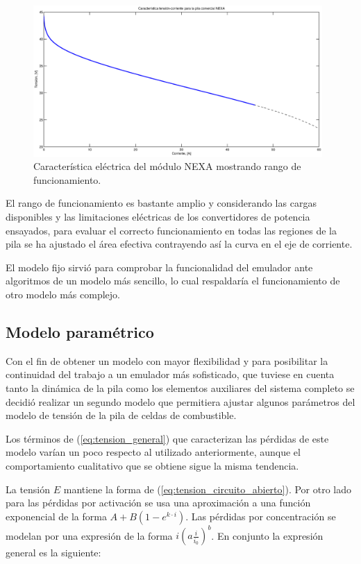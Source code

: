 \begin{figure}
 \centering
 \includegraphics[width=11cm]{gfx/caracteristica_NEXA.eps}
 \caption{Característica eléctrica del módulo NEXA mostrando rango de funcionamiento.}
 \label{fig:caracteristica_NEXA}
\end{figure}

El rango de funcionamiento es bastante amplio y considerando las cargas disponibles y las limitaciones eléctricas de los convertidores de
potencia ensayados, para evaluar el correcto funcionamiento en todas las regiones de la pila se ha ajustado el área efectiva contrayendo
así la curva en el eje de corriente.

El modelo fijo sirvió para comprobar la funcionalidad del emulador ante algoritmos de un modelo más sencillo, lo cual respaldaría el
funcionamiento de otro modelo más complejo.

\subsection{Modelo paramétrico}
Con el fin de obtener un modelo con mayor flexibilidad y para posibilitar la continuidad del trabajo a un emulador más sofisticado, que
tuviese en cuenta tanto la dinámica de la pila como los elementos auxiliares del sistema completo se decidió realizar un segundo modelo
que permitiera ajustar algunos parámetros del modelo de tensión de la pila de celdas de combustible.

Los términos de (\ref{eq:tension_general}) que caracterizan las pérdidas de este modelo varían un poco respecto al utilizado
anteriormente, aunque el comportamiento cualitativo que se obtiene sigue la misma tendencia. 

La tensión $E$ mantiene la forma de (\ref{eq:tension_circuito_abierto}). Por otro lado para las pérdidas por activación se usa una
aproximación a una función exponencial de la forma $A+B(1-e^{k\cdot i})$. Las pérdidas por concentración se modelan por una expresión
de la forma $i \left( a \frac{i}{i_0} \right)^b$. En conjunto la expresión general es la siguiente:

